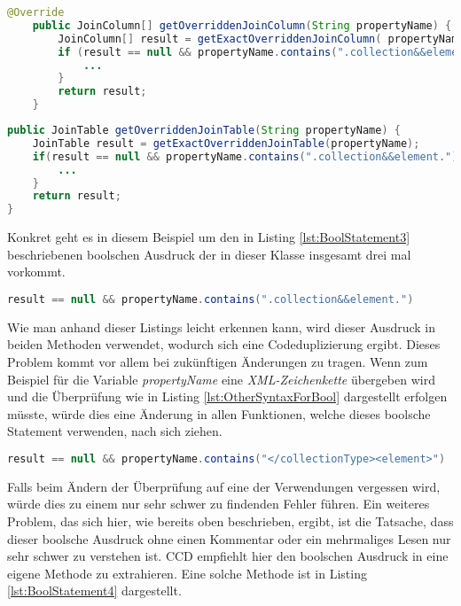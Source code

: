 \begin{lstlisting}[language=Java, caption=Komplexer boolscher Ausdruck 1, label=lst:BoolStatement1]
	@Override
	public JoinColumn[] getOverriddenJoinColumn(String propertyName) {
		JoinColumn[] result = getExactOverriddenJoinColumn( propertyName );
		if (result == null && propertyName.contains(".collection&&element.")) {
			...
		}
		return result;
	}
\end{lstlisting}

\begin{lstlisting}[language=Java, caption=Komplexer boolscher Ausdruck 2, label=lst:BoolStatement2]
public JoinTable getOverriddenJoinTable(String propertyName) {
	JoinTable result = getExactOverriddenJoinTable(propertyName);
	if(result == null && propertyName.contains(".collection&&element.")){
		...
	}
	return result;
}
\end{lstlisting}

\SuperPar Konkret geht es in diesem Beispiel um den in Listing \ref{lst:BoolStatement3} beschriebenen boolschen Ausdruck der in dieser Klasse insgesamt drei mal vorkommt.

\begin{lstlisting}[language=Java, caption=Boolscher Audruck, label=lst:BoolStatement3]
result == null && propertyName.contains(".collection&&element.")
\end{lstlisting}

\SuperPar Wie man anhand dieser Listings leicht erkennen kann, wird dieser Ausdruck in beiden Methoden verwendet, wodurch sich eine Codeduplizierung ergibt. Dieses Problem kommt vor allem bei zukünftigen Änderungen zu tragen. Wenn zum Beispiel für die Variable \textit{propertyName} eine \textit{XML-Zeichenkette} übergeben wird und die Überprüfung wie in Listing \ref{lst:OtherSyntaxForBool} dargestellt erfolgen müsste, würde dies eine Änderung in allen Funktionen, welche dieses boolsche Statement verwenden, nach sich ziehen. 

\begin{lstlisting}[language=Java, caption=Boolscher Ausdruck mit XML, label=lst:OtherSyntaxForBool]
 result == null && propertyName.contains("</collectionType><element>")
\end{lstlisting}

\SuperPar Falls beim Ändern der Überprüfung auf eine der Verwendungen vergessen wird, würde dies zu einem nur sehr schwer zu findenden Fehler führen. Ein weiteres Problem, das sich hier, wie bereits oben beschrieben, ergibt, ist die Tatsache, dass dieser boolsche Ausdruck ohne einen Kommentar oder ein mehrmaliges Lesen nur sehr schwer zu verstehen ist. CCD empfiehlt hier den boolschen Ausdruck in eine eigene Methode zu extrahieren. Eine solche Methode ist in Listing \ref{lst:BoolStatement4} dargestellt.

